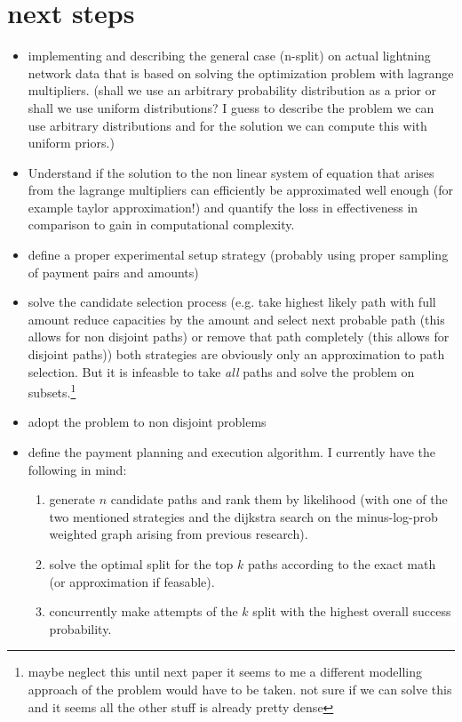 \documentclass[10pt,twocolumn]{article}
\begin{document}
\section{next steps}
\begin{itemize}
\item implementing and describing the general case (n-split) on actual lightning network data that is based on solving the optimization problem with lagrange multipliers. (shall we use an arbitrary probability distribution as a prior or shall we use uniform distributions? I guess to describe the problem we can use arbitrary distributions and for the solution we can compute this with uniform priors.)
\item Understand if the solution to the non linear system of equation that arises from the lagrange multipliers can efficiently be approximated well enough (for example taylor approximation!) and quantify the loss in effectiveness in comparison to gain in computational complexity.
\item define a proper experimental setup strategy (probably using proper sampling of payment pairs and amounts)
\item solve the candidate selection process (e.g. take highest likely path with full amount reduce capacities by the amount and select next probable path (this allows for non disjoint paths) or remove that path completely (this allows for disjoint paths)) both strategies are obviously only an approximation to path selection. But it is infeasble to take \textit{all} paths and solve the problem on subsets.\footnote{maybe neglect this until next paper it seems to me a different modelling approach of the problem would have to be taken. not sure if we can solve this and it seems all the other stuff is already pretty dense}
\item adopt the problem to non disjoint problems
\item define the payment planning and execution algorithm. I currently have the following in mind:
  \begin{enumerate}
  \item generate $n$ candidate paths and rank them by likelihood (with one of the two mentioned strategies and the dijkstra search on the minus-log-prob weighted graph arising from previous research).
  \item solve the optimal split for the top $k$ paths according to the exact math (or approximation if feasable).
  \item concurrently make attempts of the $k$ split with the highest overall success probability.

\end{enumerate}
\end{itemize}
\end{document}
